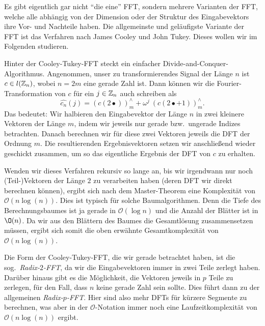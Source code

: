 Es gibt eigentlich gar nicht \enquote{die eine} FFT, sondern mehrere Varianten der FFT, welche alle 
abhängig von der Dimension oder der Struktur des Eingabevektors ihre Vor- und Nachteile haben. Die 
allgemeinste und geläufigste Variante der FFT ist das Verfahren nach James Cooley und John Tukey. 
Dieses wollen wir im Folgenden studieren.

Hinter der Cooley-Tukey-FFT steckt ein einfacher Divide-and-Conquer-Algorithmus. Angenommen, unser
zu transformierendes Signal der Länge $ n $ ist $ c \in l(\mathbb{Z}_{n}) $, wobei $ n = 2m $ eine gerade 
Zahl ist. Dann können wir die Fourier-Transformation von $ c $ für ein $ j \in \mathbb{Z}_{n} $ auch
schreiben als
\[
    \widehat{c_{n}}(j) 
  = (c(2\bullet))_{m}^{\wedge} + \omega^{j} \ (c(2\bullet + 1))_{m}^{\wedge}.
\]
Das bedeutet: Wir halbieren den Eingabevektor der Länge $ n $ in zwei kleinere Vektoren der Länge
$ m $, indem wir jeweils nur gerade bzw.\ ungerade Indizes betrachten. Danach berechnen wir für 
diese zwei Vektoren jeweils die DFT der Ordnung $ m $. Die resultierenden Ergebnisvektoren setzen 
wir anschließend wieder geschickt zusammen, um so das eigentliche Ergebnis der DFT von $ c $ zu 
erhalten.

Wenden wir dieses Verfahren rekursiv so lange an, bis wir irgendwann nur noch (Teil-)Vektoren der 
Länge $ 2 $ zu verarbeiten haben (deren DFT wir direkt berechnen können), ergibt sich nach dem
Master-Theorem eine Komplexität von $ \mathcal{O}(n \log(n)) $. Dies ist typisch für solche 
Baumalgorithmen. Denn die Tiefe des Berechnungsbaumes ist ja gerade in $ \mathcal{O}(\log n) $ und
die Anzahl der Blätter ist in $ \O(n) $. Da wir aus den Blättern des Baumes die Gesamtlösung
zusammensetzen müssen, ergibt sich somit die oben erwähnte Gesamtkomplexität von
$ \mathcal{O}(n \log(n)) $.

Die Form der Cooley-Tukey-FFT, die wir gerade betrachtet haben, ist die sog.\ \emph{Radix-$ 2 
$-FFT}, da wir die Eingabevektoren immer in zwei Teile zerlegt haben. Darüber hinaus gibt es die 
Möglichkeit, die Vektoren jeweils in $ p $ Teile zu zerlegen, für den Fall, dass $ n $ keine gerade 
Zahl sein sollte. Dies führt dann zu der allgemeinen \emph{Radix-$ p $-FFT}. Hier sind also mehr 
DFTs für kürzere Segmente zu berechnen, was aber in der $ \mathcal{O} $-Notation immer noch eine 
Laufzeitkomplexität von $ \mathcal{O}(n\log(n)) $ ergibt.

